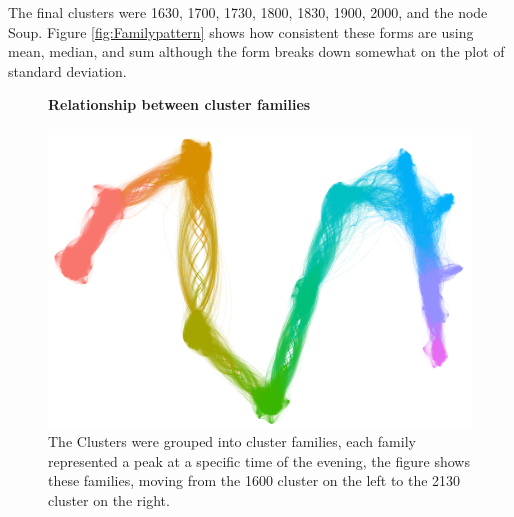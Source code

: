 The final clusters were 1630, 1700, 1730, 1800, 1830, 1900, 2000, and the node Soup. Figure \ref{fig:Familypattern} shows how consistent these forms are using mean, median, and sum although the form breaks down somewhat on the plot of standard deviation.

\begin{figure}[ht]
    \centering
    \textbf{Relationship between cluster families}\par\medskip
    \includegraphics[width=\textwidth]{Figures/Results/Dragon}
    \caption[Cluster family Graph]{The Clusters were grouped into cluster families, each family represented a peak at a specific time of the evening, the figure shows these families, moving from the 1600 cluster on the left to the 2130 cluster on the right.}
    \label{fig:DragonPlot}
\end{figure}



